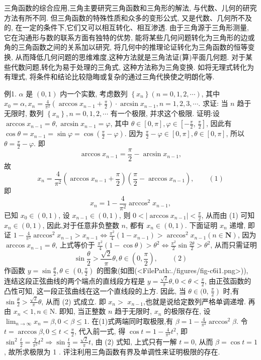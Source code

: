 
三角函数的综合应用,三角主要研究三角函数和三角形的解法, 与代数、儿何的研究方法有所不同.
但三角函数的特殊性质和众多的变形公式, 又是代数、几何所不及的, 在一定的条件下,它们又可以相互转化、相互渗透.
由于三角源于三角形测量, 它在沟通形与数的联系方面有独特的优势, 能将某些几何问题转化为三角形的边或角的三角函数之间的关系加以研究, 将几何中的推理论证转化为三角函数的恒等变换, 从而降低几何问题的思维难度,这种方法就是三角法证(算)平面几何题.
对于某些代数问题,转化为易于处理的三角式, 这种方法称为三角变换.
如将无理式转化为有理式, 将条件和结论比较隐晦或复杂的通过三角代换使之明朗化等.



例1. $ \alpha$ 是 $(0,1)$ 内一个实数, 考虑数列 $\left\{x_n\right\}(n=0,1,2, \cdots)$, 其中 $x_0=\alpha, x_n=\frac{4}{\pi^2}\left(\arccos x_{n-1}+\frac{\pi}{2}\right) \cdot \arcsin x_{n-1}, n=1,2,3, \cdots$.
求证: 当 $n$ 趋于无限时, 数列 $\left\{x_n\right\}, n=0,1,2, \cdots$ 有一个极限, 并求这个极限.
证明:设 $\arccos x_{n-1}=\theta, \arcsin x_{n-1}=\varphi$, 其中 $\theta \in[0, \pi], \varphi \in\left[-\frac{\pi}{2}\right.$, $\left.\frac{\pi}{2}\right]$, 因此有 $\cos \theta=x_{n-1}=\sin \varphi=\cos \left(\frac{\pi}{2}-\varphi\right)$.
因为 $\frac{\pi}{2}-\varphi \in[0, \pi], \theta \in[0, \pi]$, 所以 $\theta=\frac{\pi}{2}-\varphi$.
即
$$
\arccos x_{n-1}=\frac{\pi}{2}-\arcsin x_{n-1},
$$
故
$$
x_n=\frac{4}{\pi^2}\left(\arccos x_{n-1}+\frac{\pi}{2}\right)\left(\frac{\pi}{2}-\arccos x_{n-1}\right), \quad\quad(1)
$$
即
$$
x_n=1-\frac{4}{\pi^2} \arccos ^2 x_{n-1},
$$
已知 $x_0 \in(0,1)$, 设 $x_{n-1} \in(0,1)$, 则 $0<\left|\arccos x_{n-1}\right|<\frac{\pi}{2}$, 从而由 (1) 可知 $x_n \in(0,1)$, 因此,对于任意非负整数 $n$, 都有 $x_n \in(0,1)$.
下面证明 $x_n$ 递增, 即证 $1-\frac{4}{\pi^2} \arccos ^2 x_{n-1}>x_{n-1} \Leftrightarrow \frac{\pi^2}{4}\left(1-x_{n-1}\right)> \arccos ^2 x_{n-1}(n \in \mathbf{N})$, 因为 $\arccos x_{n-1}=\theta$, 上式等价于 $\frac{\pi^2}{4}(1-\cos \theta)>\theta^2 \Leftrightarrow \frac{\pi^2}{2} \sin \frac{2 \theta}{2}>\theta^2$, 从而只需证明
$$
\sin \frac{\theta}{2}>\frac{\sqrt{2}}{\pi} \theta, \theta \in\left(0, \frac{\pi}{2}\right), \quad\quad(2)
$$
作函数 $y=\sin \frac{\theta}{2}, \theta \in\left(0, \frac{\pi}{2}\right)$ 的图象(如图(<FilePath:./figures/fig-c6i1.png>)), 连结这段正弦曲线的两个端点的直线段方程是 $y= \frac{\sqrt{2}}{\pi} \theta, 0<\theta<\frac{\pi}{2}$, 由正弦函数的凸性可知, 这一段正弦曲线在这一个直线段的上方.
因此, 当 $\theta \in(0$, $\left.\frac{\pi}{2}\right)$ 时,有 $\sin \frac{\theta}{2}>\frac{\sqrt{2}}{\pi} \theta$, 从而 (2) 式成立.
即 $x_n>$
$x_{n-1}$,也就是说给定数列严格单调递增.
再由 $x_n<1, n \in \mathrm{N}$. 即知, 当正整数 $n$ 趋于无限时, $x_n$ 的极限存在, 设 $\lim _{n \rightarrow \infty} x_n=\beta, 0<\beta \leqslant 1$.
在(1)式两端同时取极限,有 $\beta=1-\frac{4}{\pi^2} \arccos ^2 \beta$.
令 $t=\arccos \beta, 0 \leqslant t<\frac{\pi}{2}$, 代入前一式, 得 $\cos t=1-\frac{4}{\pi^2} t^2$, 即 $\sin ^2 \frac{t}{2}= \frac{2}{\pi^2} t^2 \Rightarrow \sin \frac{t}{2}=\frac{\sqrt{2}}{\pi} t$, 由 (2) 式知, 上式只有一解 $t=0$, 从而 $\beta=\cos t=1$, 故所求极限为 1 .
评注利用三角函数有界及单调性来证明极限的存在.



